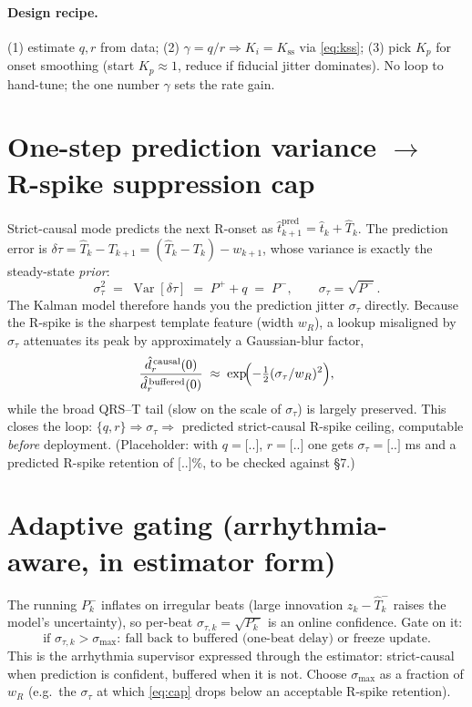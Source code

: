 \documentclass[11pt]{article}
\newcommand{\Var}{\operatorname{Var}}
\newcommand{\RRhat}{\widehat{T}}
\newcommand{\that}{\hat{t}}
\begin{document}
\paragraph{Design recipe.} (1) estimate $q,r$ from data; (2) $\gamma=q/r \Rightarrow K_i=K_{\mathrm{ss}}$
via \eqref{eq:kss}; (3) pick $K_p$ for onset smoothing (start $K_p\!\approx\!1$, reduce if fiducial
jitter dominates). No loop to hand-tune; the one number $\gamma$ sets the rate gain.

\section{One-step prediction variance $\to$ R-spike suppression cap}

Strict-causal mode predicts the next R-onset as $\that_{k+1}^{\mathrm{pred}} = \that_k + \RRhat_k$.
The prediction error is $\delta\tau = \RRhat_k - T_{k+1} = (\RRhat_k - T_k) - w_{k+1}$, whose variance
is exactly the steady-state \emph{prior}:
\begin{equation}
\sigma_\tau^2 \;=\; \Var[\delta\tau] \;=\; P^+ + q \;=\; P^-,
\qquad
\sigma_\tau = \sqrt{P^-}.
\label{eq:sigtau}
\end{equation}
The Kalman model therefore hands you the prediction jitter $\sigma_\tau$ directly. Because the R-spike
is the sharpest template feature (width $w_R$), a lookup misaligned by $\sigma_\tau$ attenuates its
peak by approximately a Gaussian-blur factor,
\begin{equation}
\frac{\hat{d}_r^{\,\mathrm{causal}}(0)}{\hat{d}_r^{\,\mathrm{buffered}}(0)}
\;\approx\; \exp\!\Bigl(-\tfrac12 (\sigma_\tau/w_R)^2\Bigr),
\label{eq:cap}
\end{equation}
while the broad QRS--T tail (slow on the scale of $\sigma_\tau$) is largely preserved. This closes the
loop: $\{q,r\}\Rightarrow\sigma_\tau\Rightarrow$ predicted strict-causal R-spike ceiling, computable
\emph{before} deployment. (Placeholder: with $q=\texttt{[..]}$, $r=\texttt{[..]}$ one gets
$\sigma_\tau=\texttt{[..]}$ ms and a predicted R-spike retention of $\texttt{[..]}\%$, to be checked
against \S7.)

\section{Adaptive gating (arrhythmia-aware, in estimator form)}

The running $P_k^-$ inflates on irregular beats (large innovation $z_k-\RRhat_k^-$ raises the model's
uncertainty), so per-beat $\sigma_{\tau,k}=\sqrt{P_k^-}$ is an online confidence. Gate on it:
\begin{equation}
\text{if } \sigma_{\tau,k} > \sigma_{\max}:\ \text{fall back to buffered (one-beat delay) or freeze update.}
\end{equation}
This is the arrhythmia supervisor expressed through the estimator: strict-causal when prediction is
confident, buffered when it is not. Choose $\sigma_{\max}$ as a fraction of $w_R$ (e.g.\ the
$\sigma_\tau$ at which \eqref{eq:cap} drops below an acceptable R-spike retention).
\end{document}
